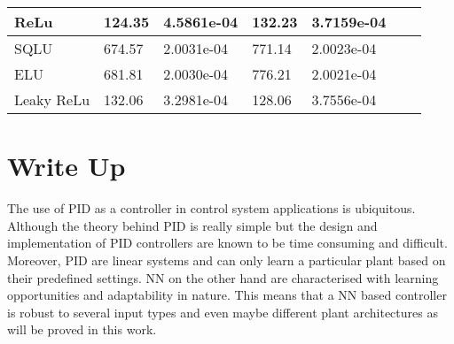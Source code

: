 \documentclass{article}
\begin{document}
\begin{table}[H]
\begin{tabular}{|l|l|l|l|l|l|l|}
ReLu                                                         & 124.35 & 4.5861e-04                                           & 132.23 & 3.7159e-04                                           &       &                                                      \\ \hline
SQLU                                                         & 674.57 & 2.0031e-04                                           & 771.14 & 2.0023e-04                                           &       &                                                      \\ \hline
ELU                                                          & 681.81 & 2.0030e-04                                           & 776.21 & 2.0021e-04                                           &       &                                                      \\ \hline
Leaky ReLu                                                   & 132.06 & 3.2981e-04                                           & 128.06 & 3.7556e-04                                           &       &                                                      \\ \hline
\end{tabular}
\end{table}


\section{Write Up}
The use of PID as a controller in control system applications is ubiquitous. Although the theory behind PID is really simple but the design and implementation of PID controllers are known to be time consuming and difficult. Moreover, PID are linear systems and can only learn a particular plant based on their predefined settings. NN on the other hand are characterised with learning opportunities and adaptability in nature. This means that a NN based controller is robust to several input types and even maybe different plant architectures as will be proved in this work.
\end{document}

